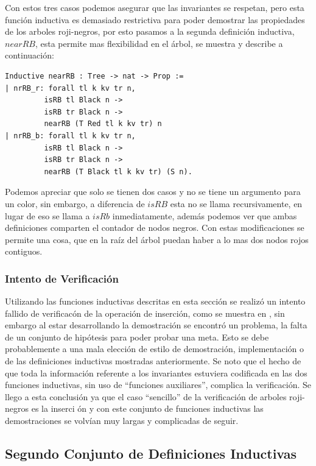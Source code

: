 \documentclass[8pt,leqno,pdflatex,spanish]{book}
\newcommand{\arns}{arboles roji-negros}
\theoremstyle{plain}
\theoremstyle{definition}
\theoremstyle{remark}
\begin{document}
Con estos tres casos podemos asegurar que las invariantes se respetan, pero esta funci\'on 
inductiva es demasiado restrictiva para poder demostrar las propiedades de los {\arns}, por esto 
pasamos a la segunda definici\'on inductiva, $nearRB$,  esta permite mas flexibilidad en el \'
arbol, se muestra y describe a continuaci\'on:

\begin{verbatim}
Inductive nearRB : Tree -> nat -> Prop :=
| nrRB_r: forall tl k kv tr n,
         isRB tl Black n ->
         isRB tr Black n ->
         nearRB (T Red tl k kv tr) n
| nrRB_b: forall tl k kv tr n,
         isRB tl Black n ->
         isRB tr Black n ->
         nearRB (T Black tl k kv tr) (S n).
\end{verbatim}
Podemos apreciar que solo se tienen dos casos y no se tiene un argumento para un color, sin 
embargo, a diferencia de $isRB$ esta no se llama recursivamente, en lugar de eso se llama a $isRb$ 
inmediatamente, además podemos ver que ambas definiciones comparten el contador de nodos negros.
Con estas modificaciones se permite una cosa, que en la ra\'iz del \'arbol puedan haber a lo mas 
dos nodos rojos contiguos.

\subsubsection{Intento de Verificaci\'on}
Utilizando las funciones inductivas descritas en esta secci\'on se realiz\'o un intento fallido de 
verificac\'on de la operaci\'on de inserci\'on, como se muestra en \cite{appel}, sin embargo al 
estar desarrollando la demostraci\'on se encontró un problema, la falta de un conjunto de 
hipótesis para poder probar una meta. Esto se debe probablemente a una mala elección de estilo de 
demostraci\'on, implementaci\'on o de las definiciones inductivas mostradas anteriormente. Se noto 
que el hecho de que toda la informaci\'on referente a los invariantes estuviera codificada en las 
dos funciones inductivas, sin uso de ``funciones auxiliares'', complica la verificaci\'on. Se 
llego a esta conclusi\'on ya que el caso ``sencillo'' de la verificaci\'on de {\arns} es la inserci
\'on y con este conjunto de funciones inductivas las demostraciones se volvían muy largas y 
complicadas de seguir.

\subsection{Segundo Conjunto de Definiciones Inductivas}
\end{document}

